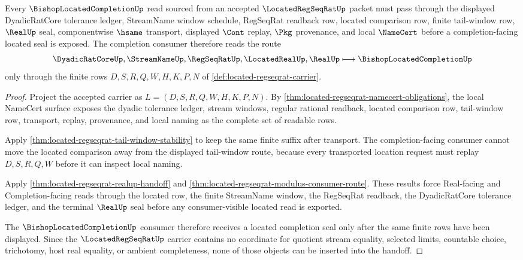 \begin{theorem}
\label{thm:located-regseqrat-bishop-completion-handoff}
Every $\BishopLocatedCompletionUp$ read sourced from an accepted $\LocatedRegSeqRatUp$ packet must pass through the displayed DyadicRatCore tolerance ledger, StreamName window schedule, RegSeqRat readback row, located comparison row, finite tail-window row, $\RealUp$ seal, componentwise $\hsame$ transport, displayed $\Cont$ replay, $\Pkg$ provenance, and local $\NameCert$ before a completion-facing located seal is exposed. The completion consumer therefore reads the route
$$
\DyadicRatCoreUp,\StreamNameUp,\RegSeqRatUp,\LocatedRealUp,\RealUp \longmapsto \BishopLocatedCompletionUp
$$
only through the finite rows $D,S,R,Q,W,H,K,P,N$ of \autoref{def:located-regseqrat-carrier}.
\end{theorem}
\begin{proof}
Project the accepted carrier as $L=(D,S,R,Q,W,H,K,P,N)$. By \autoref{thm:located-regseqrat-namecert-obligations}, the local NameCert surface exposes the dyadic tolerance ledger, stream windows, regular rational readback, located comparison row, tail-window row, transport, replay, provenance, and local naming as the complete set of readable rows.

Apply \autoref{thm:located-regseqrat-tail-window-stability} to keep the same finite suffix after transport. The completion-facing consumer cannot move the located comparison away from the displayed tail-window route, because every transported location request must replay $D,S,R,Q,W$ before it can inspect local naming.

Apply \autoref{thm:located-regseqrat-realup-handoff} and \autoref{thm:located-regseqrat-modulus-consumer-route}. These results force Real-facing and Completion-facing reads through the located row, the finite StreamName window, the RegSeqRat readback, the DyadicRatCore tolerance ledger, and the terminal $\RealUp$ seal before any consumer-visible located read is exported.

The $\BishopLocatedCompletionUp$ consumer therefore receives a located completion seal only after the same finite rows have been displayed. Since the $\LocatedRegSeqRatUp$ carrier contains no coordinate for quotient stream equality, selected limits, countable choice, trichotomy, host real equality, or ambient completeness, none of those objects can be inserted into the handoff.
\end{proof}

